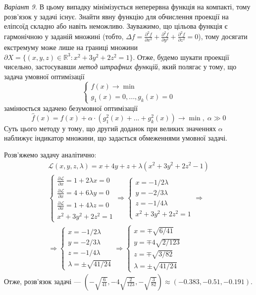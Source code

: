\documentclass{extreport}
\begin{document}
\emph{Варіант 9.} В цьому випадку мінімізується неперервна функція на компакті, тому розв'язок у задачі існує. Знайти явну функцію для обчислення проекції
на еліпсоїд складно або навіть неможливо.
Зауважимо, що цільова функція є гармонічною у заданій множині 
(тобто, $\Delta f = \frac{\partial^2 f}{\partial x^2} + \frac{\partial^2 f}{\partial y^2} + \frac{\partial^2 f}{\partial z^2} = 0$),
тому досягати екстремуму може лише на границі множини $\partial X = \{ (x,y,z) \in \mathbb{R}^3 : x^2 + 3y^2 + 2z^2 = 1 \}$. 
Отже, будемо шукати проекції чисельно, застосувавши \emph{метод штрафних функцій}, який полягає у тому, що задача умовної оптимізації
$$ 
\begin{cases}
    f(x) \to \min \\
    g_1(x) = 0, ..., g_k(x) = 0
\end{cases}
$$
замінюється задачею безумовної оптимізації
$$
\widehat{f}(x) = f(x) + \alpha \cdot \left(g_1^2(x) + ... + g_k^2(x)\right) \to \min, \; \alpha \gg 0
$$
Суть цього методу у тому, що другий доданок при великих значеннях $\alpha$ наближує індикатор множини, що задається обмеженнями умовної задачі.

Розв'яжемо задачу аналітично:
\begin{gather*}
    \mathcal{L}(x, y, z, \lambda) = x + 4y + z + \lambda(x^2 + 3y^2 + 2z^2 - 1) \\
    \begin{cases}
        \frac{\partial \mathcal{L}}{\partial x} = 1 + 2\lambda x = 0 \\
        \frac{\partial \mathcal{L}}{\partial x} = 4 + 6\lambda y = 0 \\
        \frac{\partial \mathcal{L}}{\partial x} = 1 + 4\lambda z = 0 \\
        x^2 + 3y^2 + 2z^2 = 1
    \end{cases} \Rightarrow
    \begin{cases}
        x = -1/{2\lambda} \\
        y = -2/{3\lambda} \\
        z = -1/{4\lambda} \\
        x^2 + 3y^2 + 2z^2 = 1
    \end{cases} \Rightarrow \\ \Rightarrow
    \begin{cases}
        x = -1/{2\lambda} \\
        y = -2/{3\lambda} \\
        z = -1/{4\lambda} \\
        \lambda = \pm \sqrt{41/24}
    \end{cases} \Rightarrow
    \begin{cases}
        x = \mp \sqrt{6/41} \\
        y = \mp 4\sqrt{2/123} \\
        z = \mp \sqrt{3/82} \\
        \lambda = \pm \sqrt{41/24}
    \end{cases}
\end{gather*}
Отже, розв'язок задачі --- $\left(-\sqrt{\frac{6}{41}}, -4\sqrt{\frac{2}{123}}, -\sqrt{\frac{3}{82}}\right) \approx \left(-0.383, -0.51, -0.191\right)$.
\end{document}
